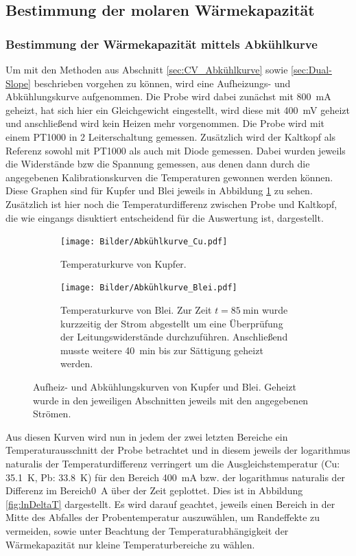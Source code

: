 \documentclass[parskip=half, a4paper,twoside,final]{article}
\begin{document}
\subsection{Bestimmung der molaren Wärmekapazität}
\subsubsection{Bestimmung der Wärmekapazität mittels Abkühlkurve}
Um mit den Methoden aus Abschnitt \ref{sec:CV_Abkühlkurve} sowie \ref{sec:Dual-Slope} beschrieben vorgehen zu können, wird eine Aufheizungs- und Abkühlungskurve aufgenommen. Die Probe wird dabei zunächst mit \SI{800}{\milli\ampere} geheizt, hat sich hier ein Gleichgewicht eingestellt, wird diese mit \SI{400}{\milli\volt} geheizt und anschließend wird kein Heizen mehr vorgenommen. Die Probe wird mit einem PT1000 in 2 Leiterschaltung gemessen. Zusätzlich wird der Kaltkopf als Referenz sowohl mit PT1000 als auch mit Diode gemessen. Dabei wurden jeweils die Widerstände bzw die Spannung gemessen, aus denen dann durch die angegebenen Kalibrationskurven die Temperaturen gewonnen werden können. Diese Graphen sind für Kupfer und Blei jeweils in Abbildung \ref{fig:Aufheiz-und Entladekurven} zu sehen. Zusätzlich ist hier noch die Temperaturdifferenz zwischen Probe und Kaltkopf, die wie eingangs disuktiert entscheidend für die Auswertung ist, dargestellt.

\begin{figure}[htp]
  \centering
  \begin{subfigure}{0.95\textwidth}
    \texttt{[image: Bilder/Abkühlkurve\_Cu.pdf]}
    \caption{Temperaturkurve von Kupfer.}
  \end{subfigure}
  \begin{subfigure}{0.95\textwidth}
    \texttt{[image: Bilder/Abkühlkurve\_Blei.pdf]}
    \caption{Temperaturkurve von Blei. Zur Zeit $t=\SI{85}{\minute}$ wurde kurzzeitig der Strom abgestellt um eine Überprüfung der Leitungswiderstände durchzuführen. Anschließend musste weitere \SI{40}{\minute} bis zur Sättigung geheizt werden.}
  \end{subfigure}
  \caption{Aufheiz- und Abkühlungskurven von Kupfer und Blei. Geheizt wurde in den jeweiligen Abschnitten jeweils mit den angegebenen Strömen.}
  \label{fig:Aufheiz-und Entladekurven}
\end{figure}

Aus diesen Kurven wird nun in jedem der zwei letzten Bereiche ein Temperaturausschnitt der Probe betrachtet und in diesem jeweils der logarithmus naturalis der Temperaturdifferenz verringert um die Ausgleichstemperatur (Cu: \SI{35,1}{\kelvin}, Pb: \SI{33,8}{\kelvin}) für den Bereich \SI{400}{\milli\ampere} bzw. der logarithmus naturalis der Differenz im Bereich\SI{0}{\ampere} über der Zeit geplottet. Dies ist in Abbildung \ref{fig:lnDeltaT} dargestellt. Es wird darauf geachtet, jeweils einen Bereich in der Mitte des Abfalles der Probentemperatur auszuwählen, um Randeffekte zu vermeiden, sowie unter Beachtung der Temperaturabhängigkeit der Wärmekapazität nur kleine Temperaturbereiche zu wählen.
\end{document}
